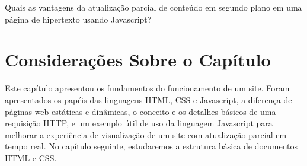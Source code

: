 \begin{exercise}
Quais as vantagens da atualização parcial de conteúdo em segundo plano em uma página de hipertexto usando Javascript?
\end{exercise}

\section{Considerações Sobre o Capítulo}

Este capítulo apresentou os fundamentos do funcionamento de um site. Foram apresentados os papéis das linguagens HTML, CSS e Javascript, a diferença de páginas web estáticas e dinâmicas, o conceito e os detalhes básicos de uma requisição HTTP, e um exemplo útil de uso da linguagem Javascript para melhorar a experiência de visualização de um site com atualização parcial em tempo real. No capítulo seguinte, estudaremos a estrutura básica de documentos HTML e CSS.